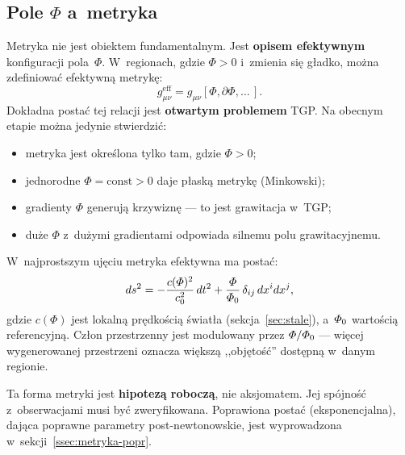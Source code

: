 \subsection{Pole $\Phi$ a~metryka}\label{ssec:metryka}

Metryka nie jest obiektem fundamentalnym. Jest \textbf{opisem
efektywnym} konfiguracji pola~$\Phi$. W~regionach, gdzie
$\Phi > 0$ i~zmienia si\k{e} g\l{}adko, mo\.zna zdefiniowa\'c
efektywn\k{a} metryk\k{e}:
\begin{equation}\label{eq:metric-from-Phi}
    g_{\mu\nu}^{\mathrm{eff}} = g_{\mu\nu}[\Phi, \partial\Phi, \ldots\,].
\end{equation}
Dok\l{}adna posta\'c tej relacji jest \textbf{otwartym problemem} TGP.
Na obecnym etapie mo\.zna jedynie stwierdzi\'c:
\begin{itemize}[nosep]
  \item metryka jest okre\'slona tylko tam, gdzie $\Phi > 0$;
  \item jednorodne $\Phi = \mathrm{const} > 0$ daje p\l{}ask\k{a}
        metryk\k{e} (Minkowski);
  \item gradienty $\Phi$ generuj\k{a} krzywizn\k{e} --- to jest
        grawitacja w~TGP;
  \item du\.ze $\Phi$ z~du\.zymi gradientami odpowiada silnemu
        polu grawitacyjnemu.
\end{itemize}

\begin{hypothesis}\label{hyp:metric}
W~najprostszym uj\k{e}ciu metryka efektywna ma posta\'c:
\begin{equation}\label{eq:metric-minimal}
    ds^2 = -\frac{c(\varPhi)^2}{c_0^2}\,dt^2
    + \frac{\varPhi}{\varPhi_0}\,\delta_{ij}\,dx^i dx^j,
\end{equation}
gdzie $c(\Phi)$ jest lokaln\k{a} pr\k{e}dko\'sci\k{a} \'swiat\l{}a
(sekcja~\ref{sec:stale}), a~$\varPhi_0$ warto\'sci\k{a} referencyjn\k{a}.
Cz\l{}on przestrzenny jest modulowany przez $\varPhi/\varPhi_0$ ---
wi\k{e}cej wygenerowanej przestrzeni oznacza wi\k{e}ksz\k{a}
,,obj\k{e}to\'s\'c'' dost\k{e}pn\k{a} w~danym regionie.
\end{hypothesis}

Ta forma metryki jest \textbf{hipotez\k{a} robocz\k{a}}, nie
aksjomatem. Jej sp\'ojno\'s\'c z~obserwacjami musi by\'c
zweryfikowana. Poprawiona posta\'c (eksponencjalna), daj\k{a}ca
poprawne parametry post-newtonowskie, jest wyprowadzona
w~sekcji~\ref{ssec:metryka-popr}.

